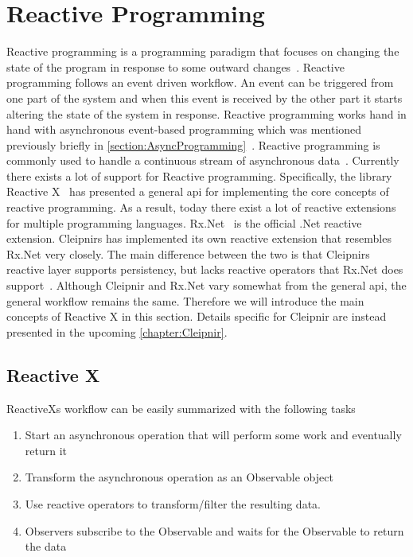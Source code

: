 \section{Reactive Programming}
\label{section:reactive}
Reactive programming is a programming paradigm that focuses on changing the state of the program in response to some outward changes~\cite{WEB:RxProgIntro, DOC:Cleipnir}.
Reactive programming follows an event driven workflow. An event can be triggered from one part of the system and when this event is received by the other part it starts altering the state of the system in response. Reactive programming works hand in hand with asynchronous event-based programming which was mentioned previously briefly in \autoref{section:AsyncProgramming}~\cite[p.~2-3]{BOOK:RxLinq}. Reactive programming is commonly used to handle a continuous stream of asynchronous data~\cite{VIDEO:dotnetsheffReactive}. 
Currently there exists a lot of support for Reactive programming. Specifically, the library Reactive X~\cite{WEB:ReactiveXMainPage} has presented a general \ac{api} for implementing the core concepts of reactive programming. As a result, today there exist a lot of reactive extensions for multiple programming languages. Rx.Net~\cite{Github:ReactiveExtensions} is the official .Net reactive extension. Cleipnirs has implemented its own reactive extension that resembles Rx.Net very closely. The main difference between the two is that Cleipnirs reactive layer supports persistency, but lacks reactive operators that Rx.Net does support~\cite{DOC:Cleipnir}.
Although Cleipnir and Rx.Net vary somewhat from the general \ac{api}, the general workflow remains the same. Therefore we will introduce the main concepts of Reactive X in this section. Details specific for Cleipnir are instead presented in the upcoming \autoref{chapter:Cleipnir}.

\subsection{Reactive X}
ReactiveXs workflow can be easily summarized with the following tasks~\cite{WEB:ReactiveObservable}
\begin{enumerate}
	\item{Start an asynchronous operation that will perform some work and eventually return it}
	\item{Transform the asynchronous operation as an Observable object}
	\item{Use reactive operators to transform/filter the resulting data.}
	\item{Observers subscribe to the Observable and waits for the Observable to return the data}
\end{enumerate}

